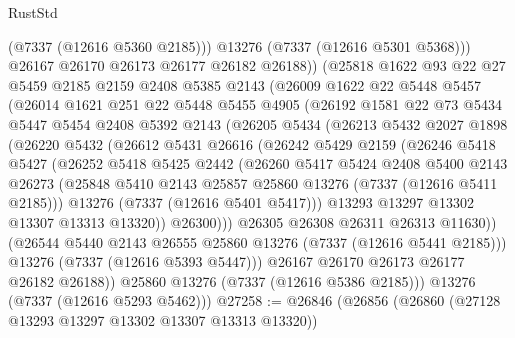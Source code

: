 \begin{lexlean}{RustStd}
\begin{coremodule}
              (@7337 (@12616 @5360 @2185)))
            @13276
            (@7337 (@12616 @5301 @5368)))
          @26167
          @26170
          @26173
          @26177
          @26182
          @26188))
      (@25818
        @1622
        @93
        @22
        @27
        @5459
        @2185
        @2159
        @2408
        @5385
        @2143
        (@26009
          @1622
          @22
          @5448
          @5457
          (@26014
            @1621
            @251
            @22
            @5448
            @5455
            @4905
            (@26192
              @1581
              @22
              @73
              @5434
              @5447
              @5454
              @2408
              @5392
              @2143
              (@26205
                @5434
                (@26213
                  @5432
                  @2027
                  @1898
                  (@26220
                    @5432
                    (@26612
                      @5431
                      @26616
                      (@26242
                        @5429
                        @2159
                        (@26246
                          @5418
                          @5427
                          (@26252
                            @5418
                            @5425
                            @2442
                            (@26260
                              @5417
                              @5424
                              @2408
                              @5400
                              @2143
                              @26273
                              (@25848 @5410 @2143 @25857 @25860 @13276 (@7337 (@12616 @5411 @2185)))
                              @13276
                              (@7337 (@12616 @5401 @5417)))
                            @13293
                            @13297
                            @13302
                            @13307
                            @13313
                            @13320))
                        @26300)))
                  @26305
                  @26308
                  @26311
                  @26313
                  @11630))
              (@26544 @5440 @2143 @26555 @25860 @13276 (@7337 (@12616 @5441 @2185)))
              @13276
              (@7337 (@12616 @5393 @5447)))
            @26167
            @26170
            @26173
            @26177
            @26182
            @26188))
        @25860
        @13276
        (@7337 (@12616 @5386 @2185)))
      @13276
      (@7337 (@12616 @5293 @5462)))
@27258 := @26846
    (@26856
      (@26860 (@27128 @13293 @13297 @13302 @13307 @13313 @13320))

\end{coremodule}
\end{lexlean}
